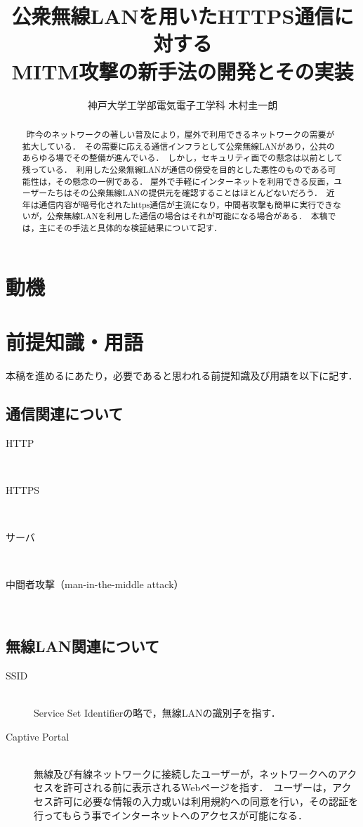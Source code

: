 \documentclass[dvipdfmx]{jsarticle}
\title{公衆無線LANを用いたHTTPS通信に対する\\MITM攻撃の新手法の開発とその実装}
\author{神戸大学工学部電気電子工学科 木村圭一朗}
\begin{document}
    \maketitle
    \begin{abstract}
        \ 昨今のネットワークの著しい普及により，屋外で利用できるネットワークの需要が拡大している．\
        その需要に応える通信インフラとして公衆無線LANがあり，公共のあらゆる場でその整備が進んでいる．\
        しかし，セキュリティ面での懸念は以前として残っている．\
        利用した公衆無線LANが通信の傍受を目的とした悪性のものである可能性は，その懸念の一例である．
        屋外で手軽にインターネットを利用できる反面，ユーザーたちはその公衆無線LANの提供元を確認することはほとんどないだろう．\
        近年は通信内容が暗号化されたhttps通信が主流になり，中間者攻撃も簡単に実行できないが，公衆無線LANを利用した通信の場合はそれが可能になる場合がある．\
        本稿では，主にその手法と具体的な検証結果について記す．
        \newline
    \end{abstract}
    \tableofcontents
    \clearpage
    \section{動機}

    \section{前提知識・用語}
    本稿を進めるにあたり，必要であると思われる前提知識及び用語を以下に記す．
    \subsection{通信関連について}
    \begin{description}
        \item[HTTP]\mbox{}\\
        \item[HTTPS]\mbox{}\\
        \item[サーバ]\mbox{}\\ 
        \item[中間者攻撃（man-in-the-middle attack）]\mbox{}\\ 
    \end{description}
    \subsection{無線LAN関連について}
    \begin{description}
        \item [SSID]\mbox{}\\
            Service Set Identifierの略で，無線LANの識別子を指す．
        \item [Captive Portal]\mbox{}\\
            無線及び有線ネットワークに接続したユーザーが，ネットワークへのアクセスを許可される前に表示されるWebページを指す．\
            ユーザーは，アクセス許可に必要な情報の入力或いは利用規約への同意を行い，その認証を行ってもらう事でインターネットへのアクセスが可能になる．
    \end{description}
\end{document}
